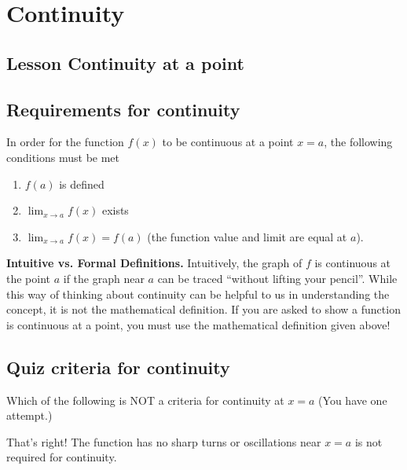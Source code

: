 \documentclass{ximera}
\begin{document}
\section{Continuity}

\subsection{Lesson Continuity at a point}

\begin{center}
\end{center}

\subsection{Requirements for continuity}

In order for the function $f(x)$ to be continuous at a point $x=a$, the following conditions must be met
\begin{enumerate}
    \item $f(a)$ is defined
    \item $\lim_{x \to a} f(x)$ exists
    \item $\lim_{x \to a} f(x) = f(a)$ (the function value and limit are equal at $a$).
\end{enumerate}

\begin{explanation}
    \begin{foldable}
        \textbf{Intuitive vs. Formal Definitions.} Intuitively, the graph of $f$ is continuous at the point $a$ if the graph near $a$ can be traced ``without lifting your pencil''. While this way of thinking about continuity can be helpful to us in understanding the concept, it is not the mathematical definition. If you are asked to show a function is continuous at a point, you must use the mathematical definition given above!
    \end{foldable}
\end{explanation}

\subsection{Quiz criteria for continuity}

\begin{question}
Which of the following is NOT a criteria for continuity at $x=a$ (You have one attempt.)
\begin{multipleChoice}  
\end{multipleChoice} 

\begin{explanation}
     That's right! The function has no sharp turns or oscillations near $x=a$ is not required for continuity.
 \end{explanation} 
\end{question}
\end{document}
